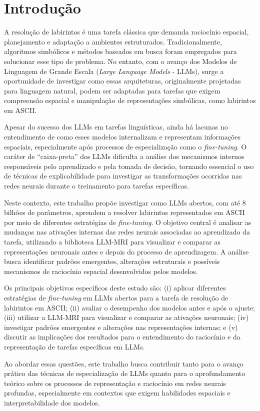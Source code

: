 \section{Introdução}

A resolução de labirintos é uma tarefa clássica que demanda raciocínio espacial, planejamento e adaptação a ambientes estruturados. Tradicionalmente, algoritmos simbólicos e métodos baseados em busca foram empregados para solucionar esse tipo de problema. No entanto, com o avanço dos Modelos de Linguagem de Grande Escala (\textit{Large Language Models} - LLMs), surge a oportunidade de investigar como essas arquiteturas, originalmente projetadas para linguagem natural, podem ser adaptadas para tarefas que exigem compreensão espacial e manipulação de representações simbólicas, como labirintos em ASCII.

Apesar do sucesso dos LLMs em tarefas linguísticas, ainda há lacunas no entendimento de como esses modelos internalizam e representam informações espaciais, especialmente após processos de especialização como o \textit{fine-tuning}. O caráter de ``caixa-preta'' dos LLMs dificulta a análise dos mecanismos internos responsáveis pelo aprendizado e pela tomada de decisão, tornando essencial o uso de técnicas de explicabilidade para investigar as transformações ocorridas nas redes neurais durante o treinamento para tarefas específicas.

Neste contexto, este trabalho propõe investigar como LLMs abertos, com até 8 bilhões de parâmetros, aprendem a resolver labirintos representados em ASCII por meio de diferentes estratégias de \textit{fine-tuning}. O objetivo central é analisar as mudanças nas ativações internas das redes neurais associadas ao aprendizado da tarefa, utilizando a biblioteca LLM-MRI \cite{costa2024llmmri} para visualizar e comparar as representações neuronais antes e depois do processo de aprendizagem. A análise busca identificar padrões emergentes, alterações estruturais e possíveis mecanismos de raciocínio espacial desenvolvidos pelos modelos.

Os principais objetivos específicos deste estudo são: (i) aplicar diferentes estratégias de \textit{fine-tuning} em LLMs abertos para a tarefa de resolução de labirintos em ASCII; (ii) avaliar o desempenho dos modelos antes e após o ajuste; (iii) utilizar a LLM-MRI para visualizar e comparar as ativações neuronais; (iv) investigar padrões emergentes e alterações nas representações internas; e (v) discutir as implicações dos resultados para o entendimento do raciocínio e da representação de tarefas específicas em LLMs.

Ao abordar essas questões, este trabalho busca contribuir tanto para o avanço prático das técnicas de especialização de LLMs quanto para o aprofundamento teórico sobre os processos de representação e raciocínio em redes neurais profundas, especialmente em contextos que exigem habilidades espaciais e interpretabilidade dos modelos.
